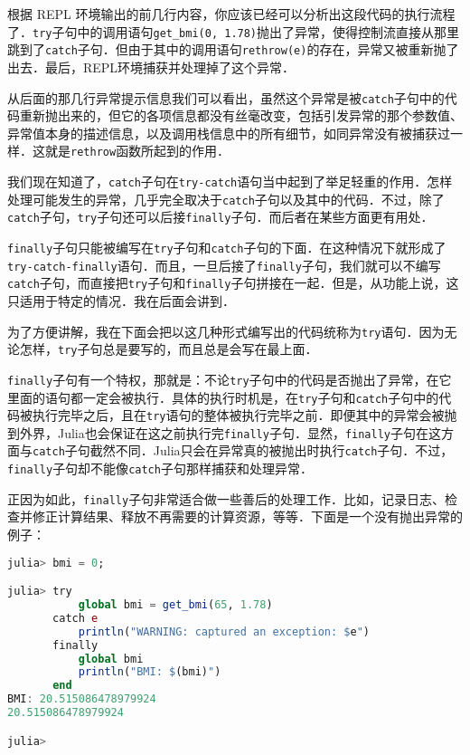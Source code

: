 根据 REPL 环境输出的前几行内容，你应该已经可以分析出这段代码的执行流程了．\verb|try|子句中的调用语句\verb|get_bmi(0, 1.78)|抛出了异常，使得控制流直接从那里跳到了\verb|catch|子句．但由于其中的调用语句\verb|rethrow(e)|的存在，异常又被重新抛了出去．最后，REPL环境捕获并处理掉了这个异常．

从后面的那几行异常提示信息我们可以看出，虽然这个异常是被\verb|catch|子句中的代码重新抛出来的，但它的各项信息都没有丝毫改变，包括引发异常的那个参数值、异常值本身的描述信息，以及调用栈信息中的所有细节，如同异常没有被捕获过一样．这就是\verb|rethrow|函数所起到的作用．

我们现在知道了，\verb|catch|子句在\verb|try-catch|语句当中起到了举足轻重的作用．怎样处理可能发生的异常，几乎完全取决于\verb|catch|子句以及其中的代码．不过，除了\verb|catch|子句，\verb|try|子句还可以后接\verb|finally|子句．而后者在某些方面更有用处．

\verb|finally|子句只能被编写在\verb|try|子句和\verb|catch|子句的下面．在这种情况下就形成了\verb|try-catch-finally|语句．而且，一旦后接了\verb|finally|子句，我们就可以不编写\verb|catch|子句，而直接把\verb|try|子句和\verb|finally|子句拼接在一起．但是，从功能上说，这只适用于特定的情况．我在后面会讲到．

为了方便讲解，我在下面会把以这几种形式编写出的代码统称为\verb|try|语句．因为无论怎样，\verb|try|子句总是要写的，而且总是会写在最上面．

\verb|finally|子句有一个特权，那就是：不论\verb|try|子句中的代码是否抛出了异常，在它里面的语句都一定会被执行．具体的执行时机是，在\verb|try|子句和\verb|catch|子句中的代码被执行完毕之后，且在\verb|try|语句的整体被执行完毕之前．即便其中的异常会被抛到外界，Julia也会保证在这之前执行完\verb|finally|子句．显然，\verb|finally|子句在这方面与\verb|catch|子句截然不同．Julia只会在异常真的被抛出时执行\verb|catch|子句．不过，\verb|finally|子句却不能像\verb|catch|子句那样捕获和处理异常．

正因为如此，\verb|finally|子句非常适合做一些善后的处理工作．比如，记录日志、检查并修正计算结果、释放不再需要的计算资源，等等．下面是一个没有抛出异常的例子：

\begin{lstlisting}[language=julia]
julia> bmi = 0;

julia> try 
           global bmi = get_bmi(65, 1.78)
       catch e
           println("WARNING: captured an exception: $e")
       finally
           global bmi
           println("BMI: $(bmi)")
       end
BMI: 20.515086478979924
20.515086478979924

julia> 
\end{lstlisting}

